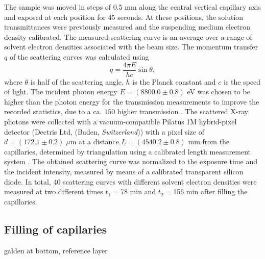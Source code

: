 The sample was moved in steps of 0.5 mm along the central vertical capillary axis and exposed at each position for 45 seconds. At these positions, the solution transmittances were previously measured and the suspending medium electron density calibrated. The measured scattering curve is an average over a range of solvent electron densities associated with the beam size. The momentum transfer \(q\) of the scattering curves was calculated using
\begin{equation}
q=\frac{4\pi E}{hc}\sin\theta ,
\end{equation}
where \(\theta\) is half of the scattering angle, \(h\) is the Planck constant and \(c\) is the speed of light. The incident photon energy \(E = \left(8800.0  \pm 0.8\right)\) eV was chosen to be higher than the photon energy for the transmission measurements to improve the recorded statistics, due to a ca. \(150\) higher transmission \cite{henke_x-ray_1993}. The scattered X-ray photons were collected with a vacuum-compatible Pilatus 1M hybrid-pixel detector (Dectris Ltd, (Baden, \emph{Switzerland})) with a pixel size of \(d = \left(172.1  \pm 0.2\right) \; \mu \)m at a distance \(L = \left(4540.2  \pm 0.8\right)\) mm from the capillaries, determined by triangulation using a calibrated length measurement system \cite{wernecke_characterization_2014}. The obtained scattering curve was normalized to the exposure time and the incident intensity, measured by means of a calibrated transparent silicon diode.  In total, 40 scattering curves with different solvent electron densities were measured at two different times \(t_1=\)78 min and \(t_2=\)156 min after filling the capillaries.


\subsection{Filling of capilaries}
galden at bottom, reference layer


